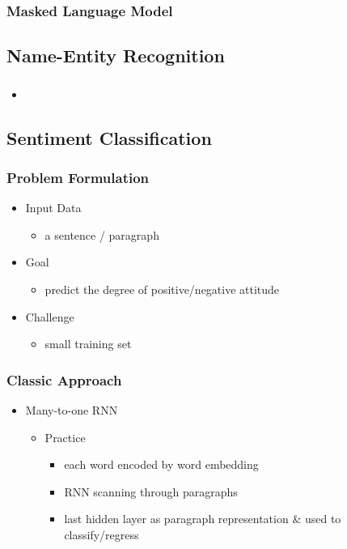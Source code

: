 \subsubsection{Masked Language Model}

\subsection{Name-Entity Recognition}
\subsubsection{}
\begin{itemize}
\item 
\end{itemize}

\subsection{Sentiment Classification}
\subsubsection{Problem Formulation}
\begin{itemize}
\item Input Data
	\begin{itemize}
	\item a sentence / paragraph
	\end{itemize}
\item Goal
	\begin{itemize}
	\item predict the degree of positive/negative attitude
	\end{itemize}
\item Challenge
	\begin{itemize}
	\item small training set
	\end{itemize}
\end{itemize}

\subsubsection{Classic Approach}
\begin{itemize}
\item Many-to-one RNN
	\begin{itemize}
	\item Practice
		\begin{itemize}
		\item each word encoded by word embedding
		\item RNN scanning through paragraphs
		\item last hidden layer as paragraph representation \& used to classify/regress
		\end{itemize}
	\end{itemize}
\end{itemize}

